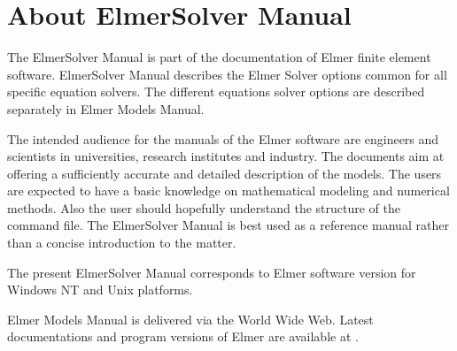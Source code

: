 \chapter*{About ElmerSolver Manual}

The ElmerSolver Manual is part of the documentation of 
Elmer finite element software.
ElmerSolver Manual describes the Elmer Solver options common for
all specific equation solvers. The different equations solver options
are described separately in Elmer Models Manual.

The intended audience for the manuals of the Elmer software 
are engineers and
scientists in universities, research institutes and industry. The documents
aim at offering a sufficiently accurate and detailed description of 
the models. The users are expected to have a 
basic knowledge on mathematical modeling and numerical methods. 
Also the user should hopefully understand the structure of the command file.
The ElmerSolver Manual is best used as a reference manual 
rather than a concise introduction to the matter. 

The present ElmerSolver Manual
corresponds to Elmer software version \elmerversion{} for 
Windows NT and Unix platforms. 

Elmer Models Manual is delivered via the World Wide Web.
Latest documentations and program versions of Elmer are available at 
. 


